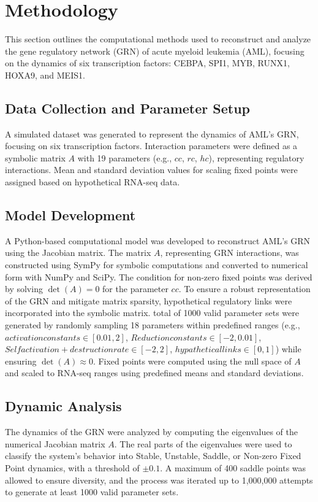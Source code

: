 \documentclass[a4paper,12pt]{article}
\begin{document}
\clearpage

\section{Methodology}
\label{sec:methodology}
This section outlines the computational methods used to reconstruct and analyze the gene regulatory network (GRN) of acute myeloid leukemia (AML), focusing on the dynamics of six transcription factors: CEBPA, SPI1, MYB, RUNX1, HOXA9, and MEIS1.

\subsection{Data Collection and Parameter Setup}
\label{subsec:data_collection}
A simulated dataset was generated to represent the dynamics of AML’s GRN, focusing on six transcription factors. Interaction parameters were defined as a symbolic matrix \( A \) with 19 parameters (e.g., \( cc \), \( rc \), \( hc \)), representing regulatory interactions. Mean and standard deviation values for scaling fixed points were assigned based on hypothetical RNA-seq data.
\subsection{Model Development}
\label{subsec:model_development}
A Python-based computational model was developed to reconstruct AML’s GRN using the Jacobian matrix. The matrix \( A \), representing GRN interactions, was constructed using SymPy for symbolic computations and converted to numerical form with NumPy and SciPy. The condition for non-zero fixed points was derived by solving \( \det(A) = 0 \) for the parameter \( cc \).
To ensure a robust representation of the GRN and mitigate matrix sparsity, hypothetical regulatory links were incorporated into the symbolic matrix. total of 1000 valid parameter sets were generated by randomly sampling 18 parameters within predefined ranges (e.g., \( activation constants \in [0.01, 2] \), \(  Reduction constants \in [-2, 0.01] \), \( Self activation + destruction rate \in [-2, 2] \), \(  hypathetical links \in [0, 1] \)) while ensuring \( \det(A) \approx 0 \). Fixed points were computed using the null space of \( A \) and scaled to RNA-seq ranges using predefined means and standard deviations.

\subsection{Dynamic Analysis}
\label{subsec:dynamic_analysis}
The dynamics of the GRN were analyzed by computing the eigenvalues of the numerical Jacobian matrix \( A \). The real parts of the eigenvalues were used to classify the system’s behavior into Stable, Unstable, Saddle, or Non-zero Fixed Point dynamics, with a threshold of \( \pm 0.1 \). A maximum of 400 saddle points was allowed to ensure diversity, and the process was iterated up to 1,000,000 attempts to generate at least 1000 valid parameter sets.
\end{document}

